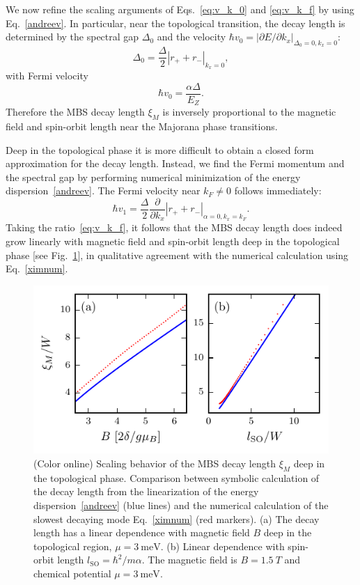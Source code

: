 We now refine the scaling arguments of Eqs.~\eqref{eq:v_k_0} and \eqref{eq:v_k_f} by using Eq.~\eqref{andreev}.
In particular, near the topological transition, the decay length is determined by the spectral gap $\Delta_0$ and the velocity $\hbar v_0=|\partial E/\partial k_x|_{\Delta_0=0,k_x=0}$:
\begin{equation}
\Delta_0=\frac{\Delta}{2}|r_++r_-|_{k_x=0},
\end{equation}
with Fermi velocity
\begin{equation}
\hbar v_0=\frac{\alpha\Delta}{E_Z}.
\end{equation}
Therefore the MBS decay length $\xi_M$ is inversely proportional to the magnetic field and spin-orbit length near the Majorana phase transitions.

Deep in the topological phase it is more difficult to obtain a closed form approximation for the decay length.
Instead, we find the Fermi momentum and the spectral gap by performing numerical minimization of the energy dispersion~\eqref{andreev}.
The Fermi velocity near $k_F\ne 0$ follows immediately:
\begin{equation}
\hbar v_1=\frac{\Delta}{2}\frac{\partial}{\partial k_x}|r_++r_-|_{\alpha=0,k_x=k_F}.
\end{equation}
Taking the ratio~\eqref{eq:v_k_f}, it follows that the MBS decay length does indeed grow linearly with magnetic field and spin-orbit length deep in the topological phase [see Fig.~\ref{fig:compAB}], in qualitative agreement with the numerical calculation using Eq.~\eqref{ximnum}.

\begin{figure}[t]
\includegraphics[width=\columnwidth]{chapter_shortjunction/figures/compAB}
\caption{
(Color online)
Scaling behavior of the MBS decay length $\xi_M$ deep in the topological phase.
Comparison between symbolic calculation of the decay length from the linearization of the energy dispersion~\eqref{andreev} (blue lines) and the numerical calculation of the slowest decaying mode Eq.~\eqref{ximnum} (red markers).
(a) The decay length has a linear dependence with magnetic field $B$ deep in the topological region, $\mu=\SI{3}{\meV}$.
(b) Linear dependence with spin-orbit length $l_\mathrm{SO}=\hbar^2/m\alpha$.
The magnetic field is $B=\SI{1.5}{T}$ and chemical potential $\mu=\SI{3}{\meV}$.}
\label{fig:compAB}
\end{figure}

